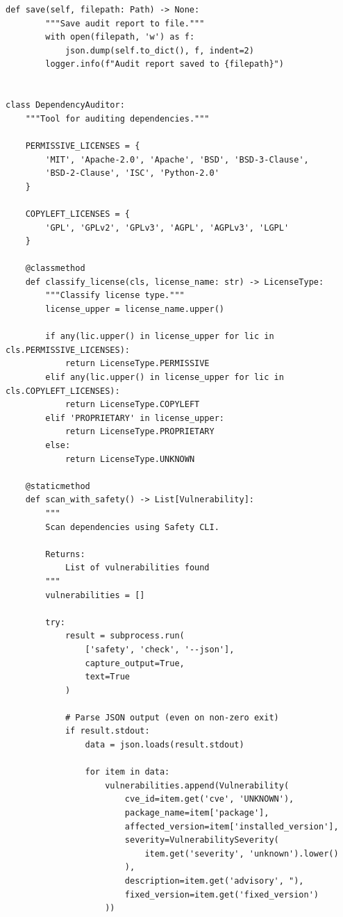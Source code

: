 \begin{lstlisting}[style=python, caption={Dependency auditing and vulnerability scanning}]
    def save(self, filepath: Path) -> None:
        """Save audit report to file."""
        with open(filepath, 'w') as f:
            json.dump(self.to_dict(), f, indent=2)
        logger.info(f"Audit report saved to {filepath}")


class DependencyAuditor:
    """Tool for auditing dependencies."""

    PERMISSIVE_LICENSES = {
        'MIT', 'Apache-2.0', 'Apache', 'BSD', 'BSD-3-Clause',
        'BSD-2-Clause', 'ISC', 'Python-2.0'
    }

    COPYLEFT_LICENSES = {
        'GPL', 'GPLv2', 'GPLv3', 'AGPL', 'AGPLv3', 'LGPL'
    }

    @classmethod
    def classify_license(cls, license_name: str) -> LicenseType:
        """Classify license type."""
        license_upper = license_name.upper()

        if any(lic.upper() in license_upper for lic in cls.PERMISSIVE_LICENSES):
            return LicenseType.PERMISSIVE
        elif any(lic.upper() in license_upper for lic in cls.COPYLEFT_LICENSES):
            return LicenseType.COPYLEFT
        elif 'PROPRIETARY' in license_upper:
            return LicenseType.PROPRIETARY
        else:
            return LicenseType.UNKNOWN

    @staticmethod
    def scan_with_safety() -> List[Vulnerability]:
        """
        Scan dependencies using Safety CLI.

        Returns:
            List of vulnerabilities found
        """
        vulnerabilities = []

        try:
            result = subprocess.run(
                ['safety', 'check', '--json'],
                capture_output=True,
                text=True
            )

            # Parse JSON output (even on non-zero exit)
            if result.stdout:
                data = json.loads(result.stdout)

                for item in data:
                    vulnerabilities.append(Vulnerability(
                        cve_id=item.get('cve', 'UNKNOWN'),
                        package_name=item['package'],
                        affected_version=item['installed_version'],
                        severity=VulnerabilitySeverity(
                            item.get('severity', 'unknown').lower()
                        ),
                        description=item.get('advisory', "),
                        fixed_version=item.get('fixed_version')
                    ))


\end{lstlisting}
